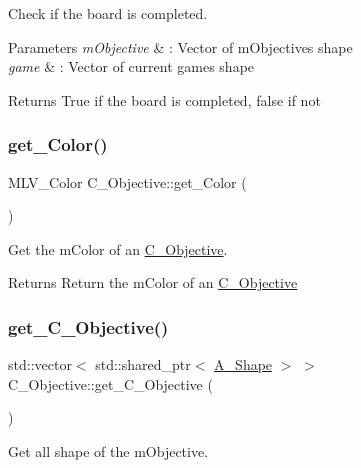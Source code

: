 Check if the board is completed. 


\begin{DoxyParams}{Parameters}
{\em mObjective} & \+: Vector of mObjective\textquotesingle{}s shape \\
\hline
{\em game} & \+: Vector of current game\textquotesingle{}s shape \\
\hline
\end{DoxyParams}
\begin{DoxyReturn}{Returns}
True if the board is completed, false if not 
\end{DoxyReturn}
\mbox{\label{classObjective_ae20161454cf0dd248b8e17989044eb13}} 
\subsubsection{\texorpdfstring{get\+\_\+\+Color()}{get\_Color()}}
{\footnotesize\ttfamily M\+L\+V\+\_\+\+Color C_Objective\+::get\+\_\+\+Color (\begin{DoxyParamCaption}{ }\end{DoxyParamCaption})}



Get the mColor of an \hyperlink{classObjective}{C_Objective}.

\begin{DoxyReturn}{Returns}
Return the mColor of an \hyperlink{classObjective}{C_Objective}
\end{DoxyReturn}
\mbox{\label{classObjective_a9d379ffa32a62fbb5e5df62a88201baf}} 
\subsubsection{\texorpdfstring{get\+\_\+\+C_Objective()}{get\_Objective()}}
{\footnotesize\ttfamily std\+::vector$<$ std\+::shared\+\_\+ptr$<$ \hyperlink{classShape}{A_Shape} $>$ $>$ C_Objective\+::get\+\_\+\+C_Objective (\begin{DoxyParamCaption}{ }\end{DoxyParamCaption})}



Get all shape of the mObjective.

